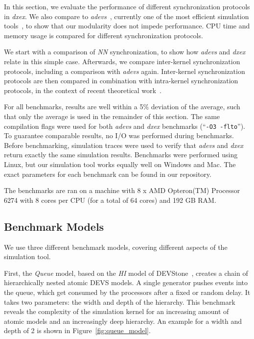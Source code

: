 In this section, we evaluate the performance of different synchronization protocols in \textit{dxex}.
We also compare to \textit{adevs}~\cite{adevs}, currently one of the most efficient simulation tools~\cite{DEVStoneJournal,DEVSSurvey}, to show that our modularity does not impede performance.
CPU time and memory usage is compared for different synchronization protocols.

We start with a comparison of \textit{NN} synchronization, to show how \textit{adevs} and \textit{dxex} relate in this simple case.
Afterwards, we compare inter-kernel synchronization protocols, including a comparison with \textit{adevs} again.
Inter-kernel synchronization protocols are then compared in combination with intra-kernel synchronization protocols, in the context of recent theoretical work~\cite{amdahlpdevs}.

For all benchmarks, results are well within a 5\% deviation of the average, such that only the average is used in the remainder of this section.
The same compilation flags were used for both \textit{adevs} and \textit{dxex} benchmarks (``\texttt{-O3 -flto}'').
To guarantee comparable results, no I/O was performed during benchmarks.
Before benchmarking, simulation traces were used to verify that \textit{adevs} and \textit{dxex} return exactly the same simulation results.
Benchmarks were performed using Linux, but our simulation tool works equally well on Windows and Mac.
The exact parameters for each benchmark can be found in our repository. 

The benchmarks are ran on a machine with 8 x AMD Opteron(TM) Processor 6274 with 8 cores per CPU (for a total of 64 cores) and 192 GB RAM.

\subsection{Benchmark Models}
We use three different benchmark models, covering different aspects of the simulation tool.

First, the \textit{Queue} model, based on the \textit{HI} model of DEVStone~\cite{DEVStone}, creates a chain of hierarchically nested atomic \textsf{DEVS} models.
A single generator pushes events into the queue, which get consumed by the processors after a fixed or random delay.
It takes two parameters: the width and depth of the hierarchy.
This benchmark reveals the complexity of the simulation kernel for an increasing amount of atomic models and an increasingly deep hierarchy.
An example for a width and depth of 2 is shown in Figure~\ref{fig:queue_model}.
	
